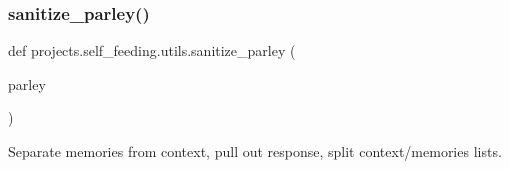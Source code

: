 \subsubsection{\texorpdfstring{sanitize\+\_\+parley()}{sanitize\_parley()}}
{\footnotesize\ttfamily def projects.\+self\+\_\+feeding.\+utils.\+sanitize\+\_\+parley (\begin{DoxyParamCaption}\item[{}]{parley }\end{DoxyParamCaption})}

\begin{DoxyVerb}Separate memories from context, pull out response, split context/memories lists.
\end{DoxyVerb}
 
